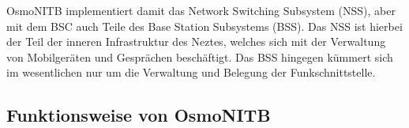OsmoNITB implementiert damit das Network Switching Subsystem (NSS), aber mit dem BSC auch Teile des Base Station Subsystems (BSS). Das NSS ist hierbei der Teil der inneren Infrastruktur des Neztes, welches sich mit der Verwaltung von Mobilgeräten und Gesprächen beschäftigt. Das BSS hingegen kümmert sich im wesentlichen nur um die Verwaltung und Belegung der Funkschnittstelle.


\subsection{Funktionsweise von OsmoNITB}
